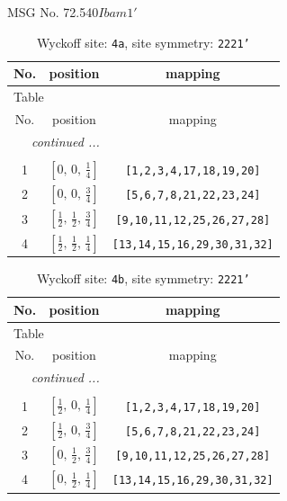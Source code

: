 \documentclass[fleqn,8pt]{jsarticle}
\begin{document}
\setcounter{MaxMatrixCols}{32}

\renewcommand{\tablename}{Table~}
\renewcommand{\figurename}{Figure~}
\begin{center}
\LARGE
MSG No. 72.540\quad$Ibam1'$
\end{center}
\renewcommand{\arraystretch}{1.2}
\begin{longtable}{ccc}
\caption{Wyckoff site: {\tt 4a}, site symmetry: {\tt 2221'}}
 \\
 \hline \hline
No. & position & mapping \\ \hline \endfirsthead

\multicolumn{2}{l}{\tablename\ \thetable{}} \\
 \hline \hline
No. & position & mapping \\ \hline \endhead

 \hline \hline
\multicolumn{2}{r}{\footnotesize\it continued ...} \\ \endfoot

 \hline \hline
\multicolumn{2}{r}{} \\ \endlastfoot

1 & $\left[ 0,\, 0,\, \frac{1}{4} \right]$ & {\tt [1,2,3,4,17,18,19,20]} \\ \hline
2 & $\left[ 0,\, 0,\, \frac{3}{4} \right]$ & {\tt [5,6,7,8,21,22,23,24]} \\ \hline
3 & $\left[ \frac{1}{2},\, \frac{1}{2},\, \frac{3}{4} \right]$ & {\tt [9,10,11,12,25,26,27,28]} \\ \hline
4 & $\left[ \frac{1}{2},\, \frac{1}{2},\, \frac{1}{4} \right]$ & {\tt [13,14,15,16,29,30,31,32]} \\
\end{longtable}
\renewcommand{\arraystretch}{1.2}
\begin{longtable}{ccc}
\caption{Wyckoff site: {\tt 4b}, site symmetry: {\tt 2221'}}
 \\
 \hline \hline
No. & position & mapping \\ \hline \endfirsthead

\multicolumn{2}{l}{\tablename\ \thetable{}} \\
 \hline \hline
No. & position & mapping \\ \hline \endhead

 \hline \hline
\multicolumn{2}{r}{\footnotesize\it continued ...} \\ \endfoot

 \hline \hline
\multicolumn{2}{r}{} \\ \endlastfoot

1 & $\left[ \frac{1}{2},\, 0,\, \frac{1}{4} \right]$ & {\tt [1,2,3,4,17,18,19,20]} \\ \hline
2 & $\left[ \frac{1}{2},\, 0,\, \frac{3}{4} \right]$ & {\tt [5,6,7,8,21,22,23,24]} \\ \hline
3 & $\left[ 0,\, \frac{1}{2},\, \frac{3}{4} \right]$ & {\tt [9,10,11,12,25,26,27,28]} \\ \hline
4 & $\left[ 0,\, \frac{1}{2},\, \frac{1}{4} \right]$ & {\tt [13,14,15,16,29,30,31,32]} \\
\end{longtable}
\end{document}
